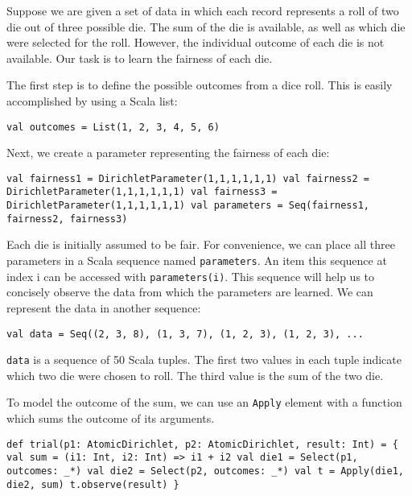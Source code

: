 Suppose we are given a set of data in which each record represents a roll of two die out of three possible die. The sum of the die is available, as well as which die were selected for the roll. However, the individual outcome of each die is not available. Our task is to learn the fairness of each die.

The first step is to define the possible outcomes from a dice roll. This is easily accomplished by using a Scala list:

\begin{flushleft}
\texttt{val outcomes = List(1, 2, 3, 4, 5, 6)}
\end{flushleft}

Next, we create a parameter representing the fairness of each die:

\begin{flushleft}
\texttt{val fairness1 = DirichletParameter(1,1,1,1,1,1) 
\newline val fairness2 = DirichletParameter(1,1,1,1,1,1) 
\newline val fairness3 = DirichletParameter(1,1,1,1,1,1) 
\newline val parameters = Seq(fairness1, fairness2, fairness3)
}
\end{flushleft}

Each die is initially assumed to be fair. For convenience, we can place all three parameters in a Scala sequence named \texttt{parameters}.  An item this sequence at index i can be accessed with \texttt{parameters(i)}. This sequence will help us to concisely observe the data from which the parameters are learned. We can represent the data in another sequence:

\begin{flushleft}
\texttt{val data = Seq((2, 3, 8), (1, 3, 7), (1, 2, 3), (1, 2, 3), ...}
\end{flushleft}

\texttt{data} is a sequence of 50 Scala tuples. The first two values in each tuple indicate which two die were chosen to roll. The third value is the sum of the two die.

To model the outcome of the sum, we can use an \texttt{Apply} element with a function which sums the outcome of its arguments.

\begin{flushleft}
\texttt{def trial(p1: AtomicDirichlet, p2: AtomicDirichlet, result: Int) = \{
\newline \tab val sum = (i1: Int, i2: Int) => i1 + i2 
\newline \tab val die1 = Select(p1, outcomes: \_*)
\newline \tab val die2 = Select(p2, outcomes: \_*)
\newline \tab val t = Apply(die1, die2, sum)
\newline \tab t.observe(result)
\newline \}
}
\end{flushleft}

